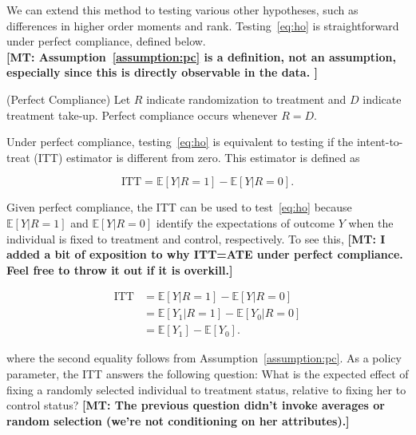 \noindent We can extend this method to testing various other hypotheses, such as differences in higher order moments and rank. Testing~\eqref{eq:ho} is straightforward under perfect compliance, defined below. \\

\textbf{[MT: Assumption~\ref{assumption:pc} is a definition, not an assumption, especially since this is directly observable in the data. ]}

\noindent \begin{assumption} \label{assumption:pc} \normalfont (Perfect Compliance) Let $R$ indicate randomization to treatment and $D$ indicate treatment take-up. Perfect compliance occurs whenever  $R = D$.\end{assumption}

\noindent Under perfect compliance, testing~\eqref{eq:ho} is equivalent to testing if the intent-to-treat (ITT) estimator is different from zero. This estimator is defined as 

\begin{equation}
\text{ITT} = \mathbb{E} \left[ Y | R = 1 \right] - \mathbb{E} \left[ Y | R = 0 \right]. \label{eq:itt}
\end{equation} 

\noindent Given perfect compliance, the ITT can be used to test~\eqref{eq:ho} because $\mathbb{E} \left[ Y | R = 1 \right]$ and $\mathbb{E} \left[ Y | R = 0 \right]$ identify the expectations of outcome $Y$ when the individual is fixed to treatment and control, respectively. To see this, \textbf{[MT: I added a bit of exposition to why ITT=ATE under perfect compliance. Feel free to throw it out if it is overkill.]}


\begin{align}
\text{ITT} &= \mathbb{E} \left[ Y | R = 1 \right] - \mathbb{E} \left[ Y | R = 0 \right] \nonumber \\
	       &= \mathbb{E} \left[ Y_{1} | R = 1 \right] - \mathbb{E} \left[ Y_{0} | R = 0 \right] \nonumber \\
	       &= \mathbb{E} \left[ Y_{1} \right] - \mathbb{E} \left[ Y_{0} \right].
\end{align} 

\noindent where the second equality follows from Assumption~\ref{assumption:pc}. As a policy parameter, the ITT answers the following question: What is the expected effect of fixing a randomly selected individual to treatment status, relative to fixing her to control status? \textbf{[MT: The previous question didn't invoke averages or random selection (we're not conditioning on her attributes).]} \\

